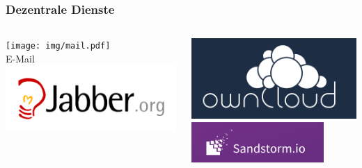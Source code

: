 \documentclass[12pt]{beamer}
\begin{document}
\begin{frame}
  \frametitle{Dezentrale Dienste}
    \begin{columns}
        \begin{column}{5cm}
            \begin{center}
                \texttt{[image: img/mail.pdf]} \\
                E-Mail \\
                \vspace{1cm}
                \includegraphics[height=0.2\textheight]{img/jabber.png}
            \end{center}
        \end{column}
        \begin{column}{5cm}
            \begin{center}
                \includegraphics[height=0.2\textheight]{img/owncloud.png} \\
                \vspace{1cm}
                \includegraphics[width=0.8\textwidth]{img/sandstorm.png}
            \end{center}
        \end{column}
    \end{columns}
\end{frame}
\end{document}
